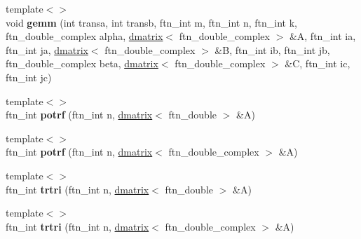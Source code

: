 \begin{DoxyCompactItemize}
\item 
\hypertarget{classsddk_1_1linalg_3_01_c_p_u_01_4_a858d99673ded81bb68f85eb0f9aec64b}{}{\footnotesize template$<$$>$ }\\void {\bfseries gemm} (int transa, int transb, ftn\+\_\+int m, ftn\+\_\+int n, ftn\+\_\+int k, ftn\+\_\+double\+\_\+complex alpha, \hyperlink{classsddk_1_1dmatrix}{dmatrix}$<$ ftn\+\_\+double\+\_\+complex $>$ \&A, ftn\+\_\+int ia, ftn\+\_\+int ja, \hyperlink{classsddk_1_1dmatrix}{dmatrix}$<$ ftn\+\_\+double\+\_\+complex $>$ \&B, ftn\+\_\+int ib, ftn\+\_\+int jb, ftn\+\_\+double\+\_\+complex beta, \hyperlink{classsddk_1_1dmatrix}{dmatrix}$<$ ftn\+\_\+double\+\_\+complex $>$ \&C, ftn\+\_\+int ic, ftn\+\_\+int jc)\label{classsddk_1_1linalg_3_01_c_p_u_01_4_a858d99673ded81bb68f85eb0f9aec64b}

\item 
\hypertarget{classsddk_1_1linalg_3_01_c_p_u_01_4_a51fd9d150e2737edd5a5c221a876648d}{}{\footnotesize template$<$$>$ }\\ftn\+\_\+int {\bfseries potrf} (ftn\+\_\+int n, \hyperlink{classsddk_1_1dmatrix}{dmatrix}$<$ ftn\+\_\+double $>$ \&A)\label{classsddk_1_1linalg_3_01_c_p_u_01_4_a51fd9d150e2737edd5a5c221a876648d}

\item 
\hypertarget{classsddk_1_1linalg_3_01_c_p_u_01_4_a9149958e054557121d3d1af3eb14fcb8}{}{\footnotesize template$<$$>$ }\\ftn\+\_\+int {\bfseries potrf} (ftn\+\_\+int n, \hyperlink{classsddk_1_1dmatrix}{dmatrix}$<$ ftn\+\_\+double\+\_\+complex $>$ \&A)\label{classsddk_1_1linalg_3_01_c_p_u_01_4_a9149958e054557121d3d1af3eb14fcb8}

\item 
\hypertarget{classsddk_1_1linalg_3_01_c_p_u_01_4_aad622197eb0885a0bb35e0596a075bdc}{}{\footnotesize template$<$$>$ }\\ftn\+\_\+int {\bfseries trtri} (ftn\+\_\+int n, \hyperlink{classsddk_1_1dmatrix}{dmatrix}$<$ ftn\+\_\+double $>$ \&A)\label{classsddk_1_1linalg_3_01_c_p_u_01_4_aad622197eb0885a0bb35e0596a075bdc}

\item 
\hypertarget{classsddk_1_1linalg_3_01_c_p_u_01_4_add4ac8d2992245ccd4e14d79c1d121c5}{}{\footnotesize template$<$$>$ }\\ftn\+\_\+int {\bfseries trtri} (ftn\+\_\+int n, \hyperlink{classsddk_1_1dmatrix}{dmatrix}$<$ ftn\+\_\+double\+\_\+complex $>$ \&A)\label{classsddk_1_1linalg_3_01_c_p_u_01_4_add4ac8d2992245ccd4e14d79c1d121c5}

\end{DoxyCompactItemize}
